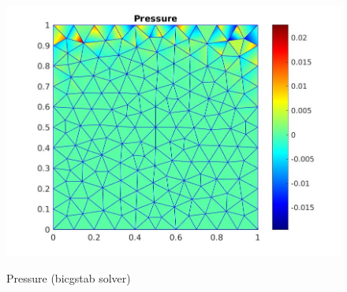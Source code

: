 \documentclass[a4paper]{book}
\begin{document}
\begin{figure}
\begin{minipage}[c]{0.67\textwidth}
    \includegraphics[width=\textwidth]{lid_bicgstab_pressure.jpg}
  \end{minipage}\hfill
  \begin{minipage}[c]{0.3\textwidth}
    \caption{Pressure (bicgstab solver)} \label{pressure_stoke_bicgstab_lid}
  \end{minipage}
\caption{\label{stoke_bicgstab_lid}}
\end{figure}
\end{document}
